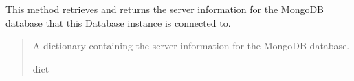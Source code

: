 \documentclass[letterpaper,10pt,english]{sphinxmanual}
\begin{document}
\begin{fulllineitems}
\begin{fulllineitems}
\sphinxAtStartPar
This method retrieves and returns the server information for the MongoDB database that this
Database instance is connected to.
\begin{quote}\begin{description}
\sphinxAtStartPar
A dictionary containing the server information for the MongoDB database.

\sphinxAtStartPar
dict

\end{description}\end{quote}

\end{fulllineitems}


\end{fulllineitems}

\end{document}
